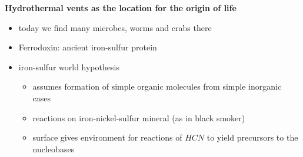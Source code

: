 \documentclass{article}
\theoremstyle{sltheorem}
\begin{document}
\textbf{Hydrothermal vents as the location for the origin of life}
\begin{itemize}
	\item today we find many microbes, worms and crabs there
	\item Ferrodoxin: ancient iron-sulfur protein
	\item iron-sulfur world hypothesis
	      \begin{itemize}
		      \item assumes formation of simple organic molecules from simple inorganic cases
		      \item reactions on iron-nickel-sulfur mineral (as in black smoker)
		      \item surface gives environment for reactions of $HCN$ to yield precursors to the nucleobases
	      \end{itemize}
\end{itemize}
\end{document}
